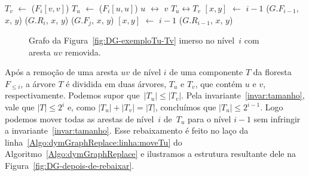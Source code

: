 \begin{algorithm}
\caption{\dymGraphReplace($G$, $u$, $v$, $niv$)}
\label{Algo:dymGraphReplace}
\begin{algorithmic}[1]
\label{Algo:dymGraphReplace:linha:primeira}
\State $T_v$ $\gets$  \treapGetRoot($F_i[v,v]$)
\State $T_u$ $\gets$  \treapGetRoot($F_i[u,u]$)
\State $u$ $\leftrightarrow$ $v$
\State $T_u \leftrightarrow T_v$
\EndIf
{}\label{Algo:dymGraphReplace:linha:moveTu}
\State \nivel$[x,y]$ $\gets$ $i-1$ \label{Algo:dymGraphReplace:linha:moveTu2}
\State \dymForestAddEdge($G$.$F_{i-1}$, $x$, $y$) \label{Algo:dymGraphReplace:linha:moveTu3}
\EndFor
{}\label{Algo:dymGraphReplace:linha:achaSub}
\State \graphDel($G$.$R_i$, $x$, $y$)
\label{Algo:dymGraphReplace:linha:inseresub}
\State \dymForestAddEdge($G$.$F_j$, $x$, $y$)
\EndFor
\State \Return
\Else
\State \nivel$[x,y]$ $\gets$ $i-1$ \label{Algo:dymGraphReplace:linha:rebaixar}
\State \graphAdd($G$.$R_{i-1}$, $x$, $y$) \label{Algo:dymGraphReplace:linha:rebaixar2}
\EndIf
\EndFor
\EndFor\label{Algo:dymGraphReplace:linha:ultima}
\end{algorithmic}
\end{algorithm}


\newpage
\begin{figure}[htb]
\centering
\caption{Grafo da Figura~\ref{fig:DG-exemploTu-Tv} imerso no nível~$i$ com aresta $uv$ removida.}
\label{fig:DG-antes-de-rebaixar}
\end{figure}

Após a remoção de uma aresta $uv$ de nível $i$ de uma componente $T$ da floresta $F_{\leqslant i}$, a árvore $T$ é dividida em duas árvores, $T_u$ e $T_v$, que contém $u$ e $v$, respectivamente. Podemos supor que~$|T_u|\leqslant |T_v|$. Pela invariante~\ref{invar:tamanho}, vale que $|T| \leq 2^i$ e, como ${|T_u| + |T_v| = |T|}$, concluímos que $|T_u| \leq 2^{i-1}$. Logo podemos mover todas as arestas de nível~$i$ de~$T_u$ para o nível $i-1$ sem infringir a invariante~\ref{invar:tamanho}.
Esse rebaixamento é feito no laço da linha~\ref{Algo:dymGraphReplace:linha:moveTu} do Algoritmo~\ref{Algo:dymGraphReplace} e ilustramos a estrutura resultante dele na Figura~\ref{fig:DG-depois-de-rebaixar}.

